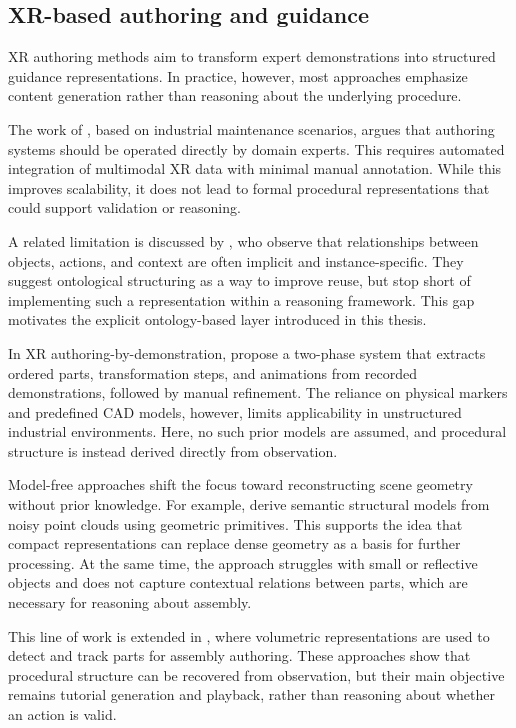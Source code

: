 \documentclass[11pt,titlepage,openright]{book}
\begin{document}
\subsection{XR-based authoring and guidance}
\label{sec:xr-authoring-guidance}

XR authoring methods aim to transform expert demonstrations into structured guidance representations. In practice, however, most approaches emphasize content generation rather than reasoning about the underlying procedure.

The work of \citet{Lorenz2018}, based on industrial maintenance scenarios, argues that authoring systems should be operated directly by domain experts. This requires automated integration of multimodal XR data with minimal manual annotation. While this improves scalability, it does not lead to formal procedural representations that could support validation or reasoning.

A related limitation is discussed by \citet{vanLopik2020}, who observe that relationships between objects, actions, and context are often implicit and instance-specific. They suggest ontological structuring as a way to improve reuse, but stop short of implementing such a representation within a reasoning framework. This gap motivates the explicit ontology-based layer introduced in this thesis.

In XR authoring-by-demonstration, \citet{BhattacharyaWiner2019} propose a two-phase system that extracts ordered parts, transformation steps, and animations from recorded demonstrations, followed by manual refinement. The reliance on physical markers and predefined CAD models, however, limits applicability in unstructured industrial environments. Here, no such prior models are assumed, and procedural structure is instead derived directly from observation.

Model-free approaches shift the focus toward reconstructing scene geometry without prior knowledge. For example, \citet{Stanescu_2018} derive semantic structural models from noisy point clouds using geometric primitives. This supports the idea that compact representations can replace dense geometry as a basis for further processing. At the same time, the approach struggles with small or reflective objects and does not capture contextual relations between parts, which are necessary for reasoning about assembly.

This line of work is extended in \citet{Stanescu_2022}, where volumetric representations are used to detect and track parts for assembly authoring. These approaches show that procedural structure can be recovered from observation, but their main objective remains tutorial generation and playback, rather than reasoning about whether an action is valid.
\end{document}
